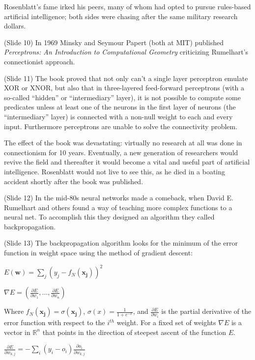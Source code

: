\documentclass[twocolumn]{article}
\begin{document}
Rosenblatt’s fame irked his peers, many of whom had opted to pursue rules-based
artificial intelligence; both sides were chasing after the same military
research dollars.

(Slide 10) In 1969 Minsky and Seymour Papert (both at MIT)
published \textit{Perceptrons: An Introduction to Computational Geometry}
criticizing Rumelhart's connectionist approach.

(Slide 11)  The book proved that not only can't a single layer perceptron
emulate XOR or XNOR, but also that in three-layered feed-forward perceptrons
(with a so-called  “hidden” or “intermediary” layer), it is not possible to
compute some predicates unless at least one of the neurons in the first layer of
neurons (the  “intermediary” layer) is connected with a non-null weight to each
and every input. Furthermore perceptrons are unable to solve the connectivity
problem.

The effect of the book was devastating: virtually no research at all was done
in connectionism for 10 years. Eventually, a new generation of researchers would
revive the field and thereafter it would become a vital and useful part of
artificial intelligence. Rosenblatt would not live to see this, as he died in a
boating accident shortly after the book was published.

(Slide 12) In the mid-80s neural networks made a comeback, when David
E. Rumelhart and others found a way of teaching more complex functions to a
neural net. To accomplish this they designed an algorithm they called
backpropagation.

(Slide 13) The backpropagation algorithm looks for the minimum of the error
function in weight space using the method of gradient descent:

\(E(\mathbf{w}) = \displaystyle\sum_{j} {(y_j - f_N(\mathbf{x_j}))}^2\)

\(\nabla E = (\frac{\partial E}{\partial w_{1}},\dotsc,\frac{\partial
  E}{\partial w_{n}})\)

Where \(f_N(\mathbf{x_j}) = \sigma(\mathbf{x_j})\), \(\sigma(x) =
\frac{1}{1+e^{-x}}\), and \(\frac{\partial E}{\partial w_{i}}\) is the partial
derivative of the error function with respect to the \(i^{th}\) weight. For a
fixed set of weights \(\nabla E\) is a vector in \(\mathbb{R}^n\) that points in
the direction of steepest ascent of the function \(E\).

\(\displaystyle \frac{\partial E}{\partial w_{k,j}} = -\sum_i (y_i -
o_i)\frac{\partial o_i}{\partial w_{k,j}}\)
\end{document}
